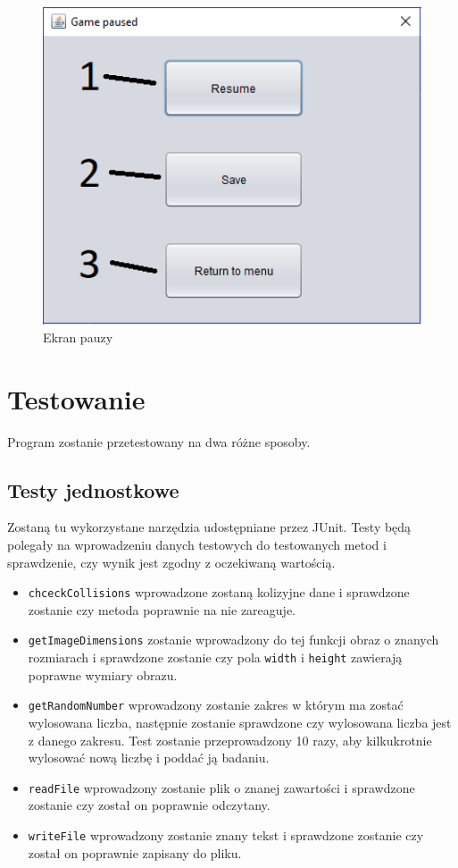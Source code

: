 \documentclass[12pt]{report}
\newcommand{\code}[1]{\texttt{#1}}
\begin{document}
\begin{enumerate}
\begin{figure}[H]
    \includegraphics[width=14cm]{obrazy/pausemenuscreen.png}
    \caption{Ekran pauzy}
    \label{Pause menu}
    \end{figure}
\end{enumerate}
\section{Testowanie}
Program zostanie przetestowany na dwa różne sposoby.
\subsection{Testy jednostkowe}
Zostaną tu wykorzystane narzędzia udostępniane przez JUnit. Testy będą polegały na wprowadzeniu danych testowych do testowanych metod i sprawdzenie, czy wynik jest zgodny z oczekiwaną wartością.
\begin{itemize}
    \item \code{chceckCollisions} wprowadzone zostaną kolizyjne dane i sprawdzone zostanie czy metoda poprawnie na nie zareaguje.
    \item \code{getImageDimensions} zostanie wprowadzony do tej funkcji obraz o znanych rozmiarach i sprawdzone zostanie czy pola \code{width} i \code{height} zawierają poprawne wymiary obrazu.
    \item \code{getRandomNumber} wprowadzony zostanie zakres w którym ma zostać wylosowana liczba, następnie zostanie sprawdzone czy wylosowana liczba jest z danego zakresu. Test zostanie przeprowadzony 10 razy, aby kilkukrotnie wylosować nową liczbę i poddać ją badaniu.
    \item \code{readFile} wprowadzony zostanie plik o znanej zawartości i sprawdzone zostanie czy został on poprawnie odczytany.
    \item \code{writeFile} wprowadzony zostanie znany tekst i sprawdzone zostanie czy został on poprawnie zapisany do pliku.
\end{itemize}
\end{document}
